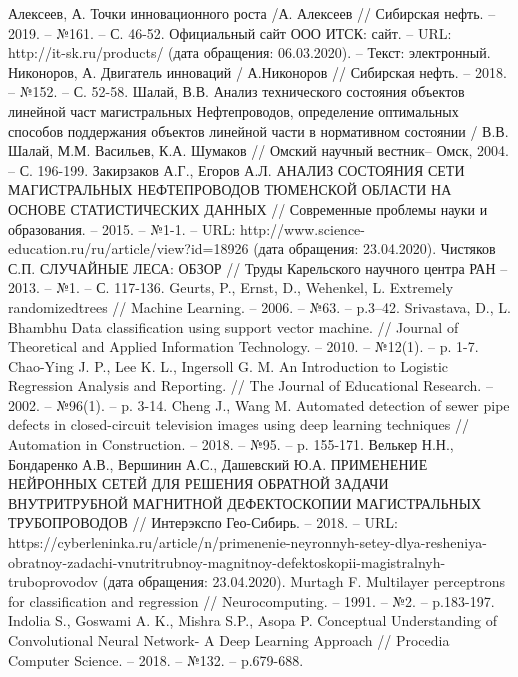 \documentclass[a4paper,article,14pt]{extarticle}
\begin{document}
\begin{thebibliography}{1}
 Алексеев, А. Точки инновационного роста /А. Алексеев // \flqq Сибирская нефть\frqq. – 2019. – №161. – С. 46-52.
 Официальный сайт ООО \flqq ИТСК\frqq: сайт. – URL: http://it-sk.ru/products/ (дата обращения: 06.03.2020). – Текст: электронный.
 Никоноров, А. Двигатель инноваций / А.Никоноров // \flqq Сибирская нефть\frqq. – 2018. – №152. – С. 52-58.
 Шалай, В.В. Анализ технического состояния объектов линейной част магистральных Нефтепроводов, определение оптимальных способов поддержания объектов линейной части в нормативном состоянии / В.В. Шалай, М.М. Васильев, К.А. Шумаков // \flqq Омский научный вестник\frqq – Омск, 2004. – С. 196-199.
 Закирзаков А.Г., Егоров А.Л. АНАЛИЗ СОСТОЯНИЯ СЕТИ МАГИСТРАЛЬНЫХ НЕФТЕПРОВОДОВ ТЮМЕНСКОЙ ОБЛАСТИ НА ОСНОВЕ СТАТИСТИЧЕСКИХ ДАННЫХ // Современные проблемы науки и образования. – 2015. – №1-1. – URL: http://www.science-education.ru/ru/article/view?id=18926 (дата обращения: 23.04.2020).
 Чистяков С.П. СЛУЧАЙНЫЕ ЛЕСА: ОБЗОР // Труды Карельского научного центра РАН – 2013. – №1. – С. 117-136.
 Geurts, P., Ernst, D., Wehenkel, L. Extremely randomizedtrees // Machine Learning. – 2006. – №63. –  p.3–42.
 Srivastava, D., L. Bhambhu Data classification  using  support  vector  machine. // Journal of Theoretical and Applied Information Technology. – 2010. – №12(1). – p. 1-7.
 Chao-Ying J. P., Lee K. L., Ingersoll G. M. An Introduction to Logistic Regression Analysis and Reporting. // The Journal of Educational Research. – 2002. – №96(1). – p. 3-14.
 Cheng J., Wang M. Automated detection of sewer pipe defects in closed-circuit television images using deep learning techniques // Automation in Construction. – 2018. – №95. – p. 155-171.
 Велькер Н.Н., Бондаренко А.В., Вершинин А.С., Дашевский Ю.А. ПРИМЕНЕНИЕ НЕЙРОННЫХ СЕТЕЙ ДЛЯ РЕШЕНИЯ ОБРАТНОЙ ЗАДАЧИ ВНУТРИТРУБНОЙ МАГНИТНОЙ ДЕФЕКТОСКОПИИ МАГИСТРАЛЬНЫХ ТРУБОПРОВОДОВ // Интерэкспо Гео-Сибирь. – 2018. – URL: https://cyberleninka.ru/article/n/primenenie-neyronnyh-setey-dlya-resheniya-obratnoy-zadachi-vnutritrubnoy-magnitnoy-defektoskopii-magistralnyh-truboprovodov (дата обращения: 23.04.2020).
 Murtagh F. Multilayer perceptrons for classification and regression // Neurocomputing. – 1991. – №2. –  p.183-197.
 Indolia S., Goswami A. K., Mishra S.P., Asopa P. Conceptual Understanding of Convolutional Neural Network- A Deep Learning Approach // Procedia Computer Science. – 2018. – №132. –  p.679-688.

\end{thebibliography}
\end{document}

